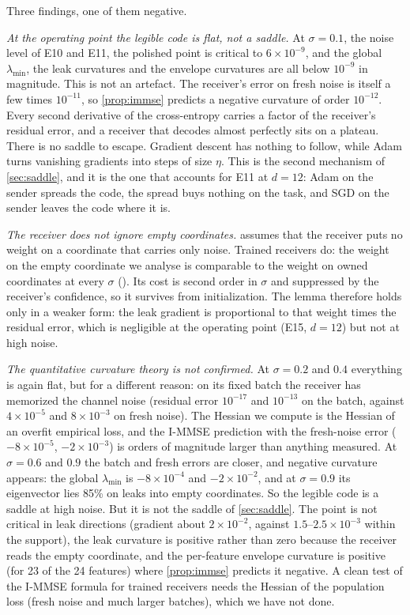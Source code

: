 Three findings, one of them negative.

\emph{At the operating point the legible code is flat, not a saddle.} At $\sigma=0.1$, the noise level of E10 and
E11, the polished point is critical to $6\times10^{-9}$, and the global $\lambda_{\min}$, the leak curvatures and the
envelope curvatures are all below $10^{-9}$ in magnitude. This is not an artefact. The
receiver's error on fresh noise is itself a few times $10^{-11}$, so \cref{prop:immse} predicts a negative curvature of
order $10^{-12}$. Every second derivative of the cross-entropy carries a factor of the receiver's residual error, and
a receiver that decodes almost perfectly sits on a plateau. There is no saddle to escape. Gradient descent has
nothing to follow, while Adam turns vanishing gradients into steps of size $\eta$. This is the second mechanism of
\cref{sec:saddle}, and it is the one that accounts for E11 at $d=12$: Adam on the sender spreads the code, the
spread buys nothing on the task, and SGD on the sender leaves the code where it is.

\emph{The receiver does not ignore empty coordinates.}  assumes that the receiver puts no weight
on a coordinate that carries only noise. Trained receivers do: the weight on the empty coordinate we analyse is
comparable to the weight on owned coordinates at every $\sigma$ (). Its cost is
second order in $\sigma$ and suppressed by the receiver's confidence, so it survives from initialization. The lemma
therefore holds only in a weaker form: the leak gradient is proportional to that weight times the residual error,
which is negligible at the operating point (E15, $d=12$) but not at high noise.

\emph{The quantitative curvature theory is not confirmed.} At $\sigma=0.2$ and $0.4$ everything is again flat, but
for a different reason: on its fixed batch the receiver has memorized the channel noise (residual error $10^{-17}$ and
$10^{-13}$ on the batch, against $4\times10^{-5}$ and $8\times10^{-3}$ on fresh noise). The Hessian we compute is the
Hessian of an overfit empirical loss, and the I-MMSE prediction with the fresh-noise error ($-8\times10^{-5}$,
$-2\times10^{-3}$) is orders of magnitude larger than anything measured. At $\sigma=0.6$ and $0.9$ the batch and
fresh errors are closer, and negative curvature appears: the global $\lambda_{\min}$ is $-8\times10^{-4}$ and
$-2\times10^{-2}$, and at $\sigma=0.9$ its eigenvector lies 85\% on leaks into empty coordinates. So the legible code
is a saddle at high noise. But it is not the saddle of \cref{sec:saddle}. The point is not critical in leak
directions (gradient about $2\times10^{-2}$, against $1.5$--$2.5\times10^{-3}$ within the support), the leak curvature is positive rather
than zero because the receiver reads the empty coordinate, and the per-feature envelope curvature is positive (for 23 of the 24
features) where \cref{prop:immse} predicts it negative. A clean test of the I-MMSE formula for trained receivers needs the Hessian of
the population loss (fresh noise and much larger batches), which we have not done.
